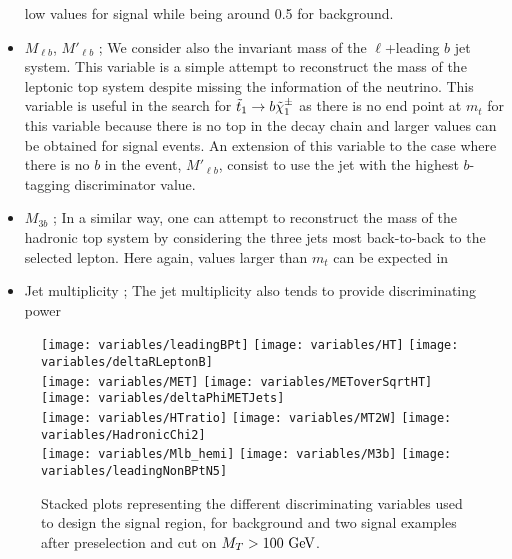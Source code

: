 \begin{itemize}
                    low values for signal while being around 0.5 for background. 
                \item $M_{\ell b}$, $M'_{\ell b}$ ; We consider also the invariant mass of the $\ell$+leading $b$ jet system. This variable
                    is a simple attempt to reconstruct the mass of the leptonic top system despite missing
                    the information of the neutrino. This variable is useful in the search for $\tilde{t}_1 \rightarrow
                    b \tilde{\chi}_1^\pm$ as there is no end point at $m_t$ for this variable because there is no
                    top in the decay chain and larger values can be obtained for signal events. An extension
                    of this variable to the case where there is no $b$ in the event, $M'_{\ell b}$, consist
                    to use the jet with the highest $b$-tagging discriminator value.
                \item $M_{3b}$ ; In a similar way, one can attempt to reconstruct the mass of the hadronic top system by considering the
                    three jets most back-to-back to the selected lepton. Here again, values larger than $m_t$ can be expected in
                \item Jet multiplicity ; The jet multiplicity also tends to provide discriminating power 
            \end{itemize}

            \begin{figure}[h!]
                \centering
                \texttt{[image: variables/leadingBPt]}
                \texttt{[image: variables/HT]}
                \texttt{[image: variables/deltaRLeptonB]}\\
                \texttt{[image: variables/MET]}
                \texttt{[image: variables/METoverSqrtHT]}
                \texttt{[image: variables/deltaPhiMETJets]}\\
                \texttt{[image: variables/HTratio]}
                \texttt{[image: variables/MT2W]}
                \texttt{[image: variables/HadronicChi2]}\\
                \texttt{[image: variables/Mlb\_hemi]}
                \texttt{[image: variables/M3b]}
                \texttt{[image: variables/leadingNonBPtN5]}
                \caption{Stacked plots representing the different discriminating variables used to design the signal region, for background and two signal examples after preselection and cut on $M_T > 100 ~\text{GeV}$.}
                \label{fig:variables}
            \end{figure}

